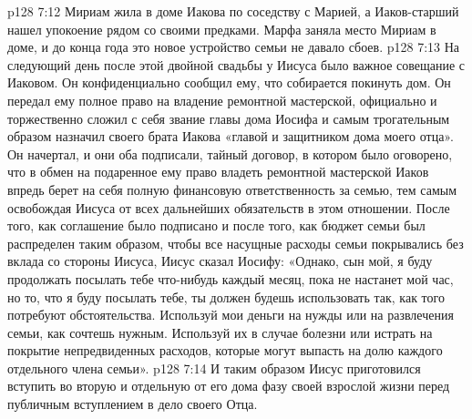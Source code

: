 \vs p128 7:12 Мириам жила в доме Иакова по соседству с Марией, а Иаков\hyp{}старший нашел упокоение рядом со своими предками. Марфа заняла место Мириам в доме, и до конца года это новое устройство семьи не давало сбоев.
\vs p128 7:13 \pc На следующий день после этой двойной свадьбы у Иисуса было важное совещание с Иаковом. Он конфиденциально сообщил ему, что собирается покинуть дом. Он передал ему полное право на владение ремонтной мастерской, официально и торжественно сложил с себя звание главы дома Иосифа и самым трогательным образом назначил своего брата Иакова «главой и защитником дома моего отца». Он начертал, и они оба подписали, тайный договор, в котором было оговорено, что в обмен на подаренное ему право владеть ремонтной мастерской Иаков впредь берет на себя полную финансовую ответственность за семью, тем самым освобождая Иисуса от всех дальнейших обязательств в этом отношении. После того, как соглашение было подписано и после того, как бюджет семьи был распределен таким образом, чтобы все насущные расходы семьи покрывались без вклада со стороны Иисуса, Иисус сказал Иосифу: «Однако, сын мой, я буду продолжать посылать тебе что\hyp{}нибудь каждый месяц, пока не настанет мой час, но то, что я буду посылать тебе, ты должен будешь использовать так, как того потребуют обстоятельства. Используй мои деньги на нужды или на развлечения семьи, как сочтешь нужным. Используй их в случае болезни или истрать на покрытие непредвиденных расходов, которые могут выпасть на долю каждого отдельного члена семьи».
\vs p128 7:14 И таким образом Иисус приготовился вступить во вторую и отдельную от его дома фазу своей взрослой жизни перед публичным вступлением в дело своего Отца.
